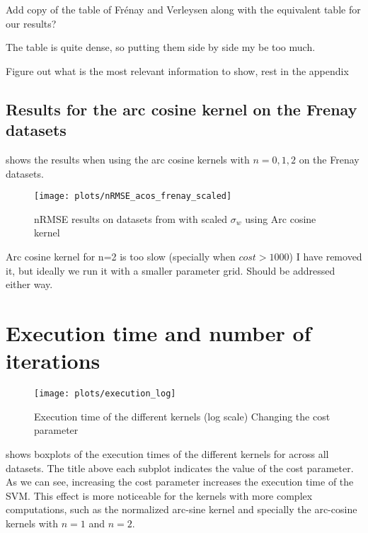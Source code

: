 \begin{cnote}
    Add copy of the table of Frénay and Verleysen along with the equivalent
    table for our results?

    The table is quite dense, so putting them side by side my be too much.

    Figure out what is the most relevant information to show, rest in the
    appendix
\end{cnote}

\subsection{Results for the arc cosine kernel on the Frenay datasets}

 shows the results when using the arc cosine kernels
with $n=0,1,2$ on the Frenay datasets.

\begin{figure}[H]
    \texttt{[image: plots/nRMSE\_acos\_frenay\_scaled]}
    \caption{nRMSE results on datasets from \cite{frenayParameterinsensitiveKernelExtreme2011} with
        scaled $\sigma_w$ using Arc cosine kernel}%
    \label{fig:nrmse-acos-frenay-scaled}
\end{figure}

\begin{cnote}
    Arc cosine kernel for n=2 is too slow (specially when $cost>1000$)
    I have removed it, but ideally we run it with a smaller parameter grid.
    Should be addressed either way.
\end{cnote}


\section{Execution time and number of iterations}

\begin{figure}[H]
    \texttt{[image: plots/execution\_log]}
    \caption{Execution time of the different kernels (log scale) Changing the cost
        parameter}%
    \label{fig:execution-log}
\end{figure}

 shows boxplots of the execution times of the different
kernels for across all datasets. The title above each subplot indicates the
value of the cost parameter. As we can see, increasing the cost parameter
increases the execution time of the SVM. This effect is more noticeable for the
kernels with more complex computations, such as the normalized arc-sine kernel
and specially the arc-cosine kernels with $n=1$ and $n=2$.

